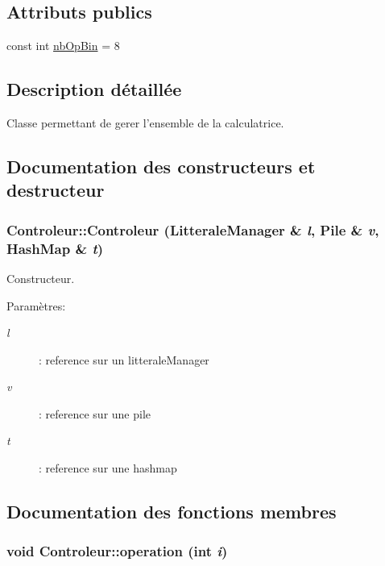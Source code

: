 \subsection*{Attributs publics}
\begin{CompactItemize}
\item 
const int \hyperlink{class_controleur_bf929a8bcaec5e62b982c59d0a7f6166}{nbOpBin} = 8
\end{CompactItemize}


\subsection{Description détaillée}
Classe permettant de gerer l'ensemble de la calculatrice. 

\subsection{Documentation des constructeurs et destructeur}
\hypertarget{class_controleur_b5ba4bff7cacbe4aaaa7f926cfb638f0}{
\subsubsection[{Controleur}]{\setlength{\rightskip}{0pt plus 5cm}Controleur::Controleur ({\bf LitteraleManager} \& {\em l}, \/  {\bf Pile} \& {\em v}, \/  {\bf HashMap} \& {\em t})}}
\label{class_controleur_b5ba4bff7cacbe4aaaa7f926cfb638f0}


Constructeur. 

\begin{Desc}
\item[Paramètres:]
\begin{description}
\item[{\em l}]: reference sur un litteraleManager \item[{\em v}]: reference sur une pile \item[{\em t}]: reference sur une hashmap \end{description}
\end{Desc}


\subsection{Documentation des fonctions membres}
\hypertarget{class_controleur_0b31c80009731bc370277e3ce62b6df7}{
\subsubsection[{operation}]{\setlength{\rightskip}{0pt plus 5cm}void Controleur::operation (int {\em i})}}
\label{class_controleur_0b31c80009731bc370277e3ce62b6df7}


